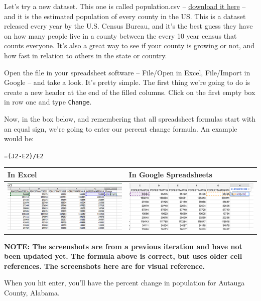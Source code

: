 \documentclass[
]{book}
\begin{document}
Let's try a new dataset. This one is called population.csv -- \href{http://mattwaite.github.io/mathanddatafiles/population.csv}{download it here} -- and it is the estimated population of every county in the US. This is a dataset released every year by the U.S. Census Bureau, and it's the best guess they have on how many people live in a county between the every 10 year census that counts everyone. It's also a great way to see if your county is growing or not, and how fast in relation to others in the state or country.

Open the file in your spreadsheet software -- File/Open in Excel, File/Import in Google -- and take a look. It's pretty simple. The first thing we're going to do is create a new header at the end of the filled columns. Click on the first empty box in row one and type \texttt{Change}.

Now, in the box below, and remembering that all spreadsheet formulas start with an equal sign, we're going to enter our percent change formula. An example would be:

\texttt{=(J2-E2)/E2}

\begin{longtable}[]{@{}ll@{}}
\toprule
In Excel & In Google Spreadsheets \\
\midrule
\endhead
\includegraphics{images/excelchange1.png} & \includegraphics{images/googlechange1.png} \\
\bottomrule
\end{longtable}

\textbf{NOTE: The screenshots are from a previous iteration and have not been updated yet. The formula above is correct, but uses older cell references. The screenshots here are for visual reference.}

When you hit enter, you'll have the percent change in population for Autauga County, Alabama.
\end{document}

